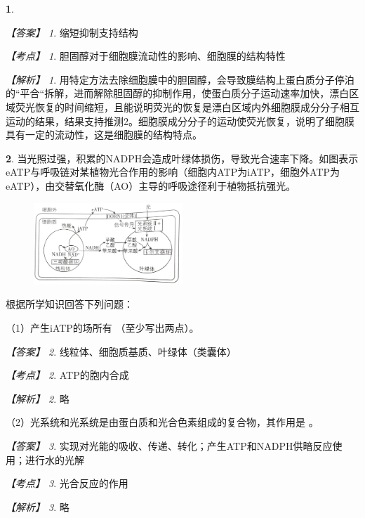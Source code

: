 \documentclass[UTF8, 10pt, a4paper, oneside]{ctexart}
\newcommand{\blank}{ \underbar{\quad$\blacktriangle$\quad} }%
\newcommand{\fs}[1]{{\fangsong #1}}%
\newcommand{\circled}[1]{{\small{\textcircled{\tiny{#1}}}}}%
\newcommand{\Romannumeral}[1]{\uppercase\expandafter{\romannumeral#1}}%
\theoremstyle{definition}
\newtheorem{exercise}{}
\theoremstyle{remark}
\newtheorem*{answer}{【答案】}
\newtheorem*{point}{【考点】}      %
\newtheorem*{explanation}{【解析】}     %
\theoremstyle{plain}
\begin{document}
\begin{exercise}
    \begin{answer}
        缩短\qquad 抑制\qquad 支持\qquad 结构
    \end{answer}
    \begin{point}
        胆固醇对于细胞膜流动性的影响、细胞膜的结构特性
    \end{point}
    \begin{explanation}
        用特定方法去除细胞膜中的胆固醇，会导致膜结构上蛋白质分子停泊的“平合“拆解，进而解除胆固醇的抑制作用，使蛋白质分子运动速率加快，漂白区域荧光恢复的时间缩短，且能说明荧光的恢复是漂白区域内外细胞膜成分分子相互运动的结果，结果支持推测\circled{2}。细胞膜成分分子的运动使荧光恢复，说明了细胞膜具有一定的流动性，这是细胞膜的结构特点。
    \end{explanation}
\end{exercise}
\begin{exercise}
    
当光照过强，积累的NADPH会造成叶绿体损伤，导致光合速率下降。如图表示eATP与呼吸链对某植物光合作用的影响（细胞内ATP为iATP，细胞外ATP为eATP），由交替氧化酶（AO）主导的呼吸途径利于植物抵抗强光。

\begin{figure}[h!]
    \centering
    \includegraphics[width=0.5\textwidth]{assists/19-1.jpg}
\end{figure}
\noindent 根据所学知识回答下列问题：

（1）产生iATP的场所有\blank（至少写出两点）。

\begin{answer}
    线粒体、细胞质基质、叶绿体（类囊体）
\end{answer}
\begin{point}
    ATP的胞内合成
\end{point}
\begin{explanation}
    \fs{略}
\end{explanation}


（2）光系统\Romannumeral{1}和光系统\Romannumeral{2}是由蛋白质和光合色素组成的复合物，其作用是\blank。

\begin{answer}
    实现对光能的吸收、传递、转化；产生ATP和NADPH供暗反应使用；进行水的光解
\end{answer}
\begin{point}
    光合反应的作用
\end{point}
\begin{explanation}
    \fs{略}
\end{explanation}


\end{exercise}
\end{document}
